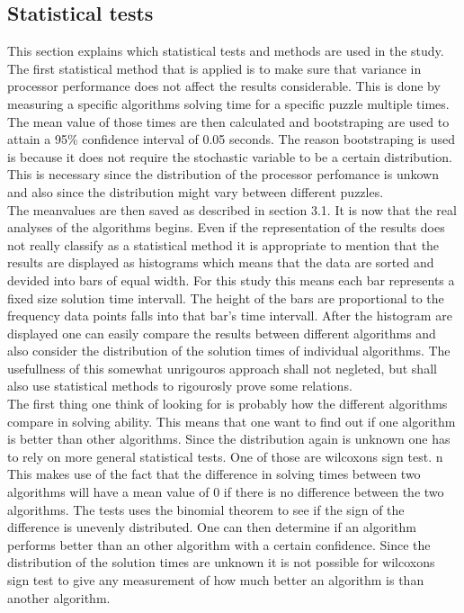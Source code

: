 \documentclass[a4paper,11pt]{kth-mag}
\begin{document}
\subsection{Statistical tests}
This section explains which statistical tests and methods are used in the study.
The first statistical method that is applied is to make sure that variance in processor performance does not affect the results considerable. 
This is done by measuring a specific algorithms solving time for a specific puzzle multiple times. 
The mean value of those times are then calculated and bootstraping are used to attain a 95\% confidence interval of 0.05 seconds. 
The reason bootstraping is used is because it does not require the stochastic variable to be a certain distribution. 
This is necessary since the distribution of the processor perfomance is unkown and also since the distribution might vary between different puzzles. \\
The meanvalues are then saved as described in section 3.1.
It is now that the real analyses of the algorithms begins. 
Even if the representation of the results does not really classify as a statistical method it is appropriate to mention that the results are displayed as histograms which means that the data are sorted and devided into bars of equal width. 
For this study this means each bar represents a fixed size solution time intervall. 
The height of the bars are proportional to the frequency data points falls into that bar's time intervall.
After the histogram are displayed one can easily compare the results between different algorithms and also consider the distribution of the solution times of individual algorithms. The usefullness of this somewhat unrigouros approach shall not negleted, but shall also use statistical methods to rigourosly prove some relations.\\
The first thing one think of looking for is probably how the different algorithms compare in solving ability. 
This means that one want to find out if one algorithm is better than other algorithms. 
Since the distribution again is unknown one has to rely on more general statistical tests. 
One of those are wilcoxons sign test. n
This makes use of the fact that the difference in solving times between two algorithms will have a mean value of 0 if there is no difference between the two algorithms. 
The tests uses the binomial theorem to see if the sign of the difference is unevenly distributed.
One can then determine if an algorithm performs better than an other algorithm with a certain confidence.
Since the distribution of the solution times are unknown it is not possible for wilcoxons sign test to give any measurement of how much better an algorithm is than another algorithm.
\end{document}

